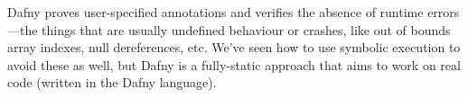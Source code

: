 \documentclass[11pt]{article}
\begin{document}
Dafny proves user-specified annotations and verifies the absence of runtime errors---the things
that are usually undefined behaviour or crashes, like out of bounds array indexes, null dereferences, etc.
We've seen how to use symbolic execution to avoid these as well, but Dafny is a fully-static approach
that aims to work on real code (written in the Dafny language).
\end{document}
